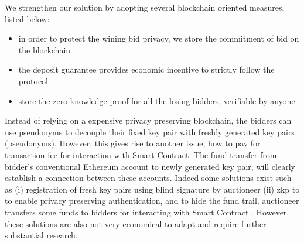 We strengthen our solution by adopting several blockchain oriented measures, listed below:
\begin{itemize}
    \item in order to protect the wining bid privacy, we store the commitment of bid on the blockchain
    \item the deposit guarantee provides economic incentive to strictly follow the protocol
    \item store the zero-knowledge proof for all the losing bidders, verifiable by anyone 
\end{itemize}


Instead of relying on a expensive privacy preserving blockchain, the bidders can use pseudonyms to decouple their fixed key pair with freshly generated key pairs (pseudonyms). However, this gives rise to another issue, how to pay for transaction fee for interaction with Smart Contract. The fund transfer from bidder's conventional Ethereum account to newly generated key pair, will clearly establish a connection between these accounts. Indeed some solutions exist such as (i) registration of fresh key pairs using blind signature by auctioneer (ii) \gls{zkp} to to enable privacy preserving authentication, and to hide the fund trail, auctioneer transfers some funds to bidders for interacting with Smart Contract \cite{blass2018strain}. However, these solutions are also not very economical to adapt and require further substantial research.  

